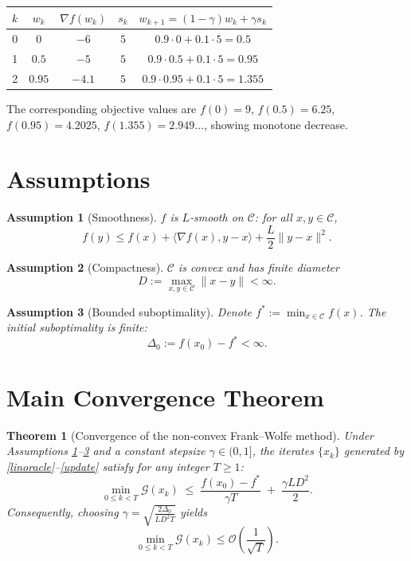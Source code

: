 \documentclass{article}
\newtheorem{theorem}{Theorem}
\newtheorem{assumption}{Assumption}
\newcommand{\Cset}{\mathcal{C}}
\newcommand{\grad}{\nabla}
\newcommand{\gap}{\mathcal{G}}
\newcommand{\inner}[2]{\langle #1,#2\rangle}
\begin{document}
\begin{center}
\begin{tabular}{c|c|c|c|c}
$k$ & $w_{k}$ & $\grad f(w_{k})$ & $s_{k}$ & $w_{k+1}= (1-\gamma)w_{k}+\gamma s_{k}$ \\ \hline
0 & $0$ & $-6$ & $5$ & $0.9\cdot0+0.1\cdot5=0.5$ \\
1 & $0.5$ & $-5$ & $5$ & $0.9\cdot0.5+0.1\cdot5=0.95$ \\
2 & $0.95$ & $-4.1$ & $5$ & $0.9\cdot0.95+0.1\cdot5=1.355$\\
\end{tabular}
\end{center}
The corresponding objective values are $f(0)=9$, $f(0.5)=6.25$, $f(0.95)=4.2025$, $f(1.355)=2.949\ldots$, showing monotone decrease.

\newpage
\section*{Assumptions}
\begin{assumption}[Smoothness]\label{ass:smooth}
$f$ is $L$‑smooth on $\Cset$: for all $x,y\in\Cset$,
\[
f(y)\le f(x)+\inner{\grad f(x)}{y-x}+\frac{L}{2}\|y-x\|^{2}.
\tag{A1}
\]
\end{assumption}
\begin{assumption}[Compactness]\label{ass:compact}
$\Cset$ is convex and has finite diameter 
\[
D:=\max_{x,y\in\Cset}\|x-y\|<\infty .
\tag{A2}
\]
\end{assumption}
\begin{assumption}[Bounded suboptimality]\label{ass:opt}
Denote $f^{*}:=\min_{x\in\Cset}f(x)$.  The initial suboptimality is finite:
\[
\Delta_{0}:=f(x_{0})-f^{*}<\infty .
\tag{A3}
\]
\end{assumption}

\section*{Main Convergence Theorem}
\begin{theorem}[Convergence of the non‑convex Frank–Wolfe method]\label{thm:fw}
Under Assumptions \ref{ass:smooth}–\ref{ass:opt} and a constant stepsize 
$\gamma\in(0,1]$, the iterates $\{x_{k}\}$ generated by \eqref{linoracle}–\eqref{update}
satisfy for any integer $T\ge1$:
\[
\min_{0\le k<T}\gap(x_{k})
\;\le\;
\frac{f(x_{0})-f^{*}}{\gamma T}
\;+\;
\frac{\gamma L D^{2}}{2}.
\tag{3}
\]
Consequently, choosing $\gamma=\sqrt{\frac{2\Delta_{0}}{L D^{2}T}}$ yields 
\[
\min_{0\le k<T}\gap(x_{k})\le
\mathcal{O}\!\left(\frac{1}{\sqrt{T}}\right).
\]
\end{theorem}
\end{document}
